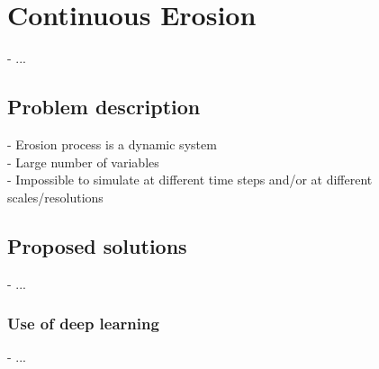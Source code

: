 \chapter{Continuous Erosion}
\label{chap:continuous-erosion}
\minitoc

- ...

\section{Problem description}
\label{sec:continuous-erosion_problematic}
- Erosion process is a dynamic system \\
- Large number of variables \\
- Impossible to simulate at different time steps and/or at different scales/resolutions

\section{Proposed solutions}
\label{sec:continuous-erosion_solutions}
- ...

\subsection{Use of deep learning}
- ...
